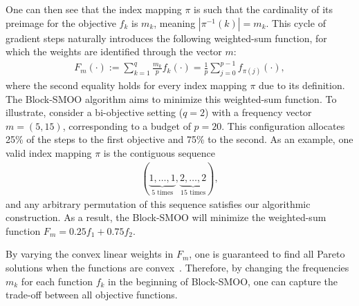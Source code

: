 \documentclass[11pt,a4paper]{article}
\numberwithin{equation}{section}%
\renewcommand{\(}{\left (}
\renewcommand{\)}{\right )}
\newcommand{\Fm}{F_m}
\begin{document}
One can then see that the index mapping $\pi$ %
is such that %
the cardinality of its preimage for the objective $f_k$ is $m_k$, meaning $|\pi^{-1}(k)| = m_k$.
This cycle of gradient steps naturally introduces the following weighted-sum function, for which the weights are identified through the vector $m$:
\begin{align*}
    \Fm (\cdot) := \sum_{k=1}^q \frac{m_k}{p} f_k(\cdot) = \frac{1}{p}\sum_{j=0}^{p-1}f_{\pi(j)} (\cdot),
\end{align*}
where the second equality holds for every index mapping $\pi$ due to its definition. The Block-SMOO algorithm aims to minimize this weighted-sum function. 
To illustrate, consider a bi-objective setting ($q=2$) with a frequency vector $m = (5, 15)$, corresponding to a budget of $p = 20$. This configuration allocates 25\% of the steps to the first objective and 75\% to the second. As an example, one valid index mapping $\pi$ is the contiguous sequence 
\begin{align*}
    (\underbrace{1, \dots, 1}_{5 \text{ times}}, \underbrace{2, \dots, 2}_{15 \text{ times}}),
\end{align*}
and any arbitrary permutation of this sequence satisfies our algorithmic construction. As a result, the Block-SMOO will minimize the weighted-sum function $F_m = 0.25 f_1 + 0.75 f_2$. 

By varying the convex linear weights in $F_m$, one is guaranteed to find all Pareto solutions when the functions are convex~\cite{KMiettinen_2012,MEhrgott_2005}.
Therefore, by changing the frequencies $m_k$ for each function $f_k$ in the beginning of Block-SMOO, one can capture the trade-off between all objective functions. 
\end{document}
